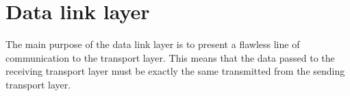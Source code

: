 \chapter{Data link layer}\label{chap:dll}
The main purpose of the data link layer is to present a flawless line of
communication to the transport layer. This means that the data passed to the
receiving transport layer must be exactly the same transmitted from the sending
transport layer. 
